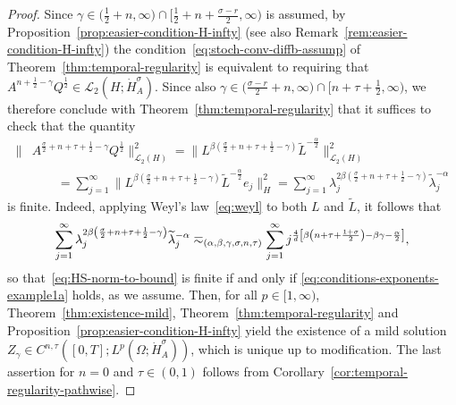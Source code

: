 \documentclass[reqno]{amsart}
\numberwithin{equation}{section}
\newcommand{\Hdot}[1]{\dot{H}^{#1}_A}
\theoremstyle{remark}
\theoremstyle{definition}
\begin{document}
\begin{proof}
	Since 
	$\gamma\in \bigl(\frac{1}{2}+n,\infty\bigr)\cap 
	\bigl[\frac{1}{2}+n+\frac{\sigma-r}{2},\infty\bigr)$ 
	is assumed, 
	by
	Proposition~\ref{prop:easier-condition-H-infty} 
	(see also Remark~\ref{rem:easier-condition-H-infty})
	the condition~\eqref{eq:stoch-conv-diffb-assump} 
	of Theorem~\ref{thm:temporal-regularity} 
	is equivalent to 
	requiring that 
	$A^{n+\frac{1}{2}-\gamma}Q^{\frac{1}{2}} \in 
	\mathscr L_2(H;\dot H_A^\sigma)$. 
	Since also 
	$\gamma\in\bigl( \frac{\sigma-r}{2} + n, \infty\bigr) 
	\cap \bigl[n + \tau +\frac{1}{2}, \infty\bigr)$, 
	we therefore conclude with Theorem~\ref{thm:temporal-regularity} 
	that it suffices to check that 
	the quantity
	\begin{equation}\label{eq:HS-norm-to-bound}  
	\begin{split} 
	\bigl\| & A^{\frac{\sigma}{2} + n + \tau + \frac{1}{2} - \gamma } 
	Q^{\frac{1}{2}} 
	\bigr\|_{\mathscr L_2(H)}^2 
	= 
	\bigl\| 
	L^{\beta\left( \frac{\sigma}{2}+n+\tau + \frac{1}{2}-\gamma \right)} 
	\widetilde L^{-\frac{\alpha}{2}} 
	\bigr\|_{\mathscr L_2(H)}^2 
	\\
	&\qquad = 
	\sum_{j=1}^\infty 
	\bigl\| 
	L^{\beta \left(\frac{\sigma}{2}+n+\tau + \frac{1}{2}-\gamma \right)}
	\widetilde L^{-\frac{\alpha}{2}} e_j 
	\bigr\|_H^2 
	= 
	\sum_{j=1}^\infty 
	\lambda_j^{2\beta\left( \frac{\sigma}{2}+n+\tau + \frac{1}{2}-\gamma \right)}
	\widetilde{\lambda}_j^{-\alpha} 
	\end{split} 
	\end{equation}
	is finite.
	Indeed, applying Weyl's law~\eqref{eq:weyl}
	to both $L$ and $\widetilde L$, it follows that 
	\[
	\sum_{j=1}^\infty 
	\lambda_j^{2\beta\left( \frac{\sigma}{2}+n+\tau + \frac{1}{2}-\gamma \right)}
	\widetilde{\lambda}_j^{-\alpha} 
	\eqsim_{\text(\alpha,\beta,\gamma,\sigma,n,\tau)}
	\sum_{j=1}^\infty 
	j^{\frac{4}{d} \left[ \beta\left( n+\tau + \frac{1+\sigma}{2} \right) 
		-\beta\gamma -\frac{\alpha}{2}\right]},
	\] 
	so that~\eqref{eq:HS-norm-to-bound} is finite if and only if 
	\eqref{eq:conditions-exponents-example1a} holds, as we assume.
	Then, 
	for all $p \in [1,\infty)$, 
	Theorem~\ref{thm:existence-mild}, 
	Theorem~\ref{thm:temporal-regularity} 
	and Proposition~\ref{prop:easier-condition-H-infty} 
	yield the existence of a mild solution 
	$Z_\gamma\in C^{n,\tau}([0,T]; L^p(\Omega;\Hdot \sigma))$, 
	which is unique up to modification. 
	The last assertion for $n = 0$ and 
	$\tau\in(0,1)$ follows from
	Corollary~\ref{cor:temporal-regularity-pathwise}.
\end{proof}
\end{document}
